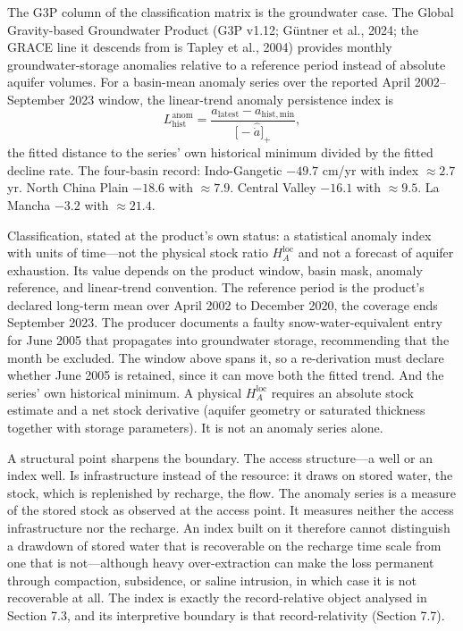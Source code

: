 \documentclass[11pt]{article}
\begin{document}
The G3P column of the classification matrix is the groundwater case. The Global Gravity-based Groundwater Product (G3P v1.12; G\"untner et al., 2024; the GRACE line it descends from is Tapley et al., 2004) provides monthly groundwater-storage anomalies relative to a reference period instead of absolute aquifer volumes. For a basin-mean anomaly series over the reported April 2002--September 2023 window, the linear-trend anomaly persistence index is \[L_{\mathrm{hist}}^{\mathrm{anom}} = \frac{a_{\mathrm{latest}} - a_{\mathrm{hist,min}}}{\bigl[ -\widehat{\dot a} \bigr]_+},\] the fitted distance to the series' own historical minimum divided by the fitted decline rate. The four-basin record: Indo-Gangetic \(-49.7\) cm/\allowbreak{}yr with index \(\approx 2.7\) yr. North China Plain \(-18.6\) with \(\approx 7.9\). Central Valley \(-16.1\) with \(\approx 9.5\). La Mancha \(-3.2\) with \(\approx 21.4\).

Classification, stated at the product's own status: a statistical anomaly index with units of time---not the physical stock ratio \(H_A^{\mathrm{loc}}\) and not a forecast of aquifer exhaustion. Its value depends on the product window, basin mask, anomaly reference, and linear-trend convention. The reference period is the product's declared long-term mean over April 2002 to December 2020, the coverage ends September 2023. The producer documents a faulty snow-water-equivalent entry for June 2005 that propagates into groundwater storage, recommending that the month be excluded. The window above spans it, so a re-derivation must declare whether June 2005 is retained, since it can move both the fitted trend. And the series' own historical minimum. A physical \(H_A^{\mathrm{loc}}\) requires an absolute stock estimate and a net stock derivative (aquifer geometry or saturated thickness together with storage parameters). It is not an anomaly series alone.

A structural point sharpens the boundary. The access structure---a well or an index well. Is infrastructure instead of the resource: it draws on stored water, the stock, which is replenished by recharge, the flow. The anomaly series is a measure of the stored stock as observed at the access point. It measures neither the access infrastructure nor the recharge. An index built on it therefore cannot distinguish a drawdown of stored water that is recoverable on the recharge time scale from one that is not---although heavy over-extraction can make the loss permanent through compaction, subsidence, or saline intrusion, in which case it is not recoverable at all. The index is exactly the record-relative object analysed in Section 7.3, and its interpretive boundary is that record-relativity (Section 7.7).
\end{document}
